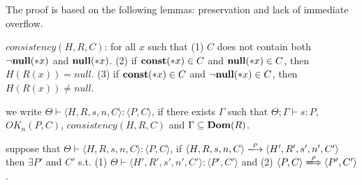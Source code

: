 The proof is based on the following lemmas: preservation and lack of
immediate overflow.

\begin{myDef}
\label{df:Rdu}
\(consistency(H, R, C)\): for all \(x\) such that (1) \(C\) does not contain
both \(\neg{\bf null}(*x)\) and \({\bf null}(*x)\). (2) if \(\mathbf{const}(*x) \in C \) and
\({\bf null}(*x) \in C\), then \(H(R(x)) = null\). (3) if \(\mathbf{const}(*x) \in C
\) and \(\neg{\bf null}(*x) \in C\), then \(H(R(x)) \neq null\).
\end{myDef}

\begin{myDef}
  \label{df:Rdu}
  we write \( \Theta \vdash \langle H, R, s, n, C \rangle : \langle P,
  C \rangle\), if there exists \(\Gamma\) such that \(\Theta; \Gamma \vdash s : P\), \(OK_n(P, C)\), \(consistency(H, R, C)\) and \(\Gamma \subseteq \mathbf{Dom}(R)\).
\end{myDef}

 
\begin{lemma}[Preservation]
\label{lem:preservation}
suppose that \( \Theta \vdash \langle H, R, s, n, C \rangle : \langle
P, C \rangle\), if \( \langle H, R, s, n, C \rangle
\xlongrightarrow{\rho} \langle H', R', s', n', C' \rangle\) then
\(\exists P'\) and \(C'\) s.t. (1) \( \Theta \vdash
\langle H', R', s', n', C' \rangle : \langle P', C' \rangle\) and (2)
\(\langle P, C \rangle \xLongrightarrow{\rho} \langle P', C'\rangle
\).
\end{lemma}


